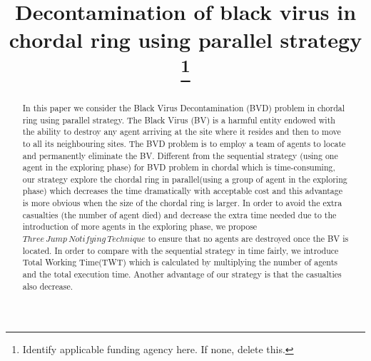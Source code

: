 \documentclass[conference]{IEEEtran}
\begin{document}
\title{Decontamination of black virus in chordal ring using parallel strategy
\\
{\footnotesize \textsuperscript{}}
\thanks{Identify applicable funding agency here. If none, delete this.}
}

\author{
\and
{}
\and
{}
}

\maketitle

\begin{abstract}
In this paper we consider the Black Virus Decontamination (BVD) problem in chordal ring using parallel strategy. The Black Virus (BV) is a harmful entity endowed with the ability to destroy any agent arriving at the site where it resides and then to move to all its neighbouring sites. The BVD problem is to employ a team of agents to locate and permanently eliminate the BV. Different from the sequential strategy (using one agent in the exploring phase) for BVD problem in chordal which is time-consuming, our strategy explore the chordal ring in parallel(using a group of agent in the exploring phase) which decreases the time dramatically with acceptable cost and this advantage is more obvious when the size of the chordal ring is larger. In order to avoid the extra casualties (the number of agent died) and decrease the extra time needed due to the introduction of more agents in the exploring phase, we propose $Three\,Jump\,Notifying\,Technique$ to ensure that no agents are destroyed once the BV is located. In order to compare with the sequential strategy in time fairly, we introduce Total Working Time(TWT) which is calculated by multiplying the number of agents and the total execution time. Another advantage of our strategy is that the casualties also decrease.\end{abstract}
\end{document}
